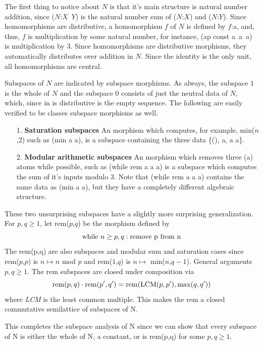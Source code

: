 \documentclass[11pt]{article}
\begin{document}
     The first thing to notice about $N$ is that it's main structure is natural number addition, since ($N$:$X$\ $Y$) is the natural number sum of ($N$:$X$) and ($N$:$Y$).  
Since homomorphisms are distributive, a homomorphism $f$ of $N$ is defined by $f$:a, and, thus, $f$ is multiplication by some natural number, 
for instance, (ap const a\ a\ a) is multiplication by $3$.  Since homomorphisms are distributive morphisms, they automatically distributes over addition in $N$.  
Since the identity is the only unit, all homomorphisms are central.  
     
    Subspaces of $N$ are indicated by subspace morphisms.  As always, the subspace $1$ is the whole of $N$ and the subspace $0$ consists of just the neutral data of $N$, which, 
since in is distributive is the empty sequence.  The following are easily verified to be classes subspace morphisms as well.  
\begin{itemize} 
\item [1.] {\bf Saturation subspaces} An morphism which computes, for example, min($n$,2) such as (min a a), is a subspace containing the three data \{(), a, a a\}. 
\item [2.] {\bf Modular arithmetic subspaces} An morphism which removes three (a) atoms while possible, such as (while rem a a a) is a subspace which computes the sum of it's inputs modulo 3.  Note 
that (while rem a a a) contains the same data as (min a a), but they have a completely different algebraic structure.  
\end{itemize}
These two unsurprising subspaces have a slightly more surprising generalization.  For $p,q\ge 1$, let rem($p$,$q$) be the morphism defined by 
\begin{equation}
{\rm while}\ n\ge p,q: {\rm remove\ p\ from\ n}
\end{equation}
The rem(p,q) are also subspaces and modular sum and saturation cases since rem($p$,$p$) is $n\mapsto n$ mod $p$ and rem($1$,$q$) is $n\mapsto$ min($n$,$q-1$).   General arguments $p,q\ge 1$.  The rem subspaces are closed under composition via 
\begin{equation}
{\rm rem}(p,q)\cdot {\rm rem}(p',q') = {\rm rem}({\rm LCM}(p,p'),{\rm max}(q,q'))
\end{equation}
where {\it LCM} is the least common multiple.  This makes the rem a closed commutative semilattice of subspaces of N.  

This completes the subspace analysis of N since we can show that every subspace of N is either the whole of N, a constant, or is rem(p,q) for some $p,q\ge1$. 
\end{document}
